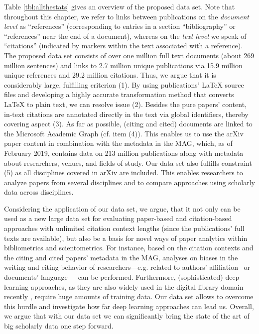 Table \ref{tbl:allthestats} gives an overview of the proposed data set. Note that throughout this chapter, we refer to links between publications on the \emph{document level} as ``references'' (corresponding to entries in a section ``bibliography'' or ``references'' near the end of a document), whereas on the \emph{text level} we speak of ``citations'' (indicated by markers within the text associated with a reference). The proposed data set consists of over one million full text documents (about 269 million sentences) and links to 2.7 million unique publications via 15.9 million unique references and 29.2 million citations.
Thus, we argue that it is considerably large, fulfilling criterion (1). By using publications' \LaTeX{} source files and developing a highly accurate transformation method that converts \LaTeX{} to plain text, we can resolve issue (2). Besides the pure papers' content, in-text citations are annotated directly in the text via global identifiers, thereby covering aspect (3). As far as possible, (citing and cited) documents are linked to the Microsoft Academic Graph \cite{Sinha2015MAG} (cf. item (4)). This enables us to use the arXiv paper content in combination with the metadata in the MAG, which, as of February 2019, contains data on 213 million publications along with metadata about researchers, venues, and fields of study. Our data set also fulfills constraint (5) as all disciplines covered in arXiv are included. This enables researchers to analyze papers from several disciplines and to compare approaches using scholarly data across disciplines.

Considering the application of our data set, we argue, that it not only can be used as a new large data set for evaluating paper-based and citation-based approaches with unlimited citation context lengths (since the publications' full texts are available),
but also be a basis for novel ways of paper analytics within bibliometrics and scientometrics. For instance, based on the citation contexts and the citing and cited papers' metadata in the MAG, analyses on biases in the writing and citing behavior of researchers---e.g. related to authors' affiliation~\cite{Reingewertz2018} or documents' language~\cite{Liang2013,Liu2018}---can be performed.
Furthermore, (sophisticated) deep learning approaches, as they are also widely used in the digital library domain recently \cite{Ebensu2017}, require huge amounts of training data. Our data set allows to overcome this hurdle and investigate how far deep learning approaches can lead us.
Overall, we argue that with our data set we can significantly bring the state of the art of big scholarly data one step forward.

